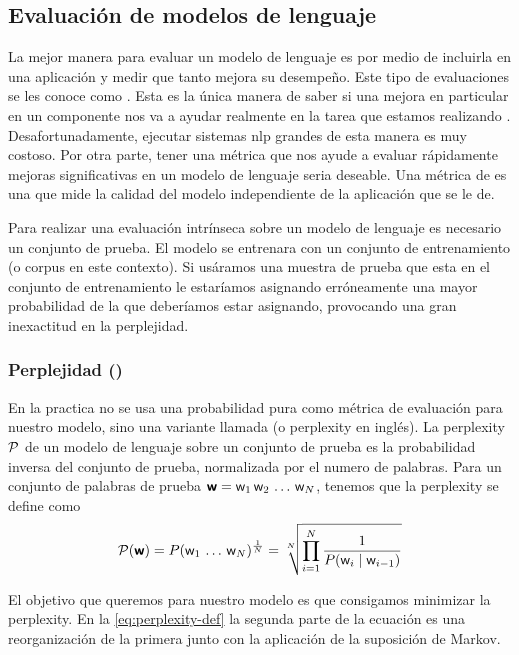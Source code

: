 \subsection{Evaluación de modelos de lenguaje}
La mejor manera para evaluar un modelo de lenguaje es por medio de incluirla en una aplicación y medir que tanto mejora su desempeño. Este tipo de evaluaciones se les conoce como . Esta es la única manera de saber si una mejora en particular en un componente nos va a ayudar realmente en la tarea que estamos realizando \cite{jurafsky-martin}. Desafortunadamente, ejecutar sistemas \gls{nlp} grandes de esta manera es muy costoso. Por otra parte, tener una métrica que nos ayude a evaluar rápidamente mejoras significativas en un modelo de lenguaje seria deseable. Una métrica de  es una que mide la calidad del modelo independiente de la aplicación que se le de.

Para realizar una evaluación intrínseca sobre un modelo de lenguaje es necesario un conjunto de prueba. El modelo se entrenara con un conjunto de entrenamiento (o \gls{corpus} en este contexto). Si usáramos una muestra de prueba que esta en el conjunto de entrenamiento le estaríamos asignando erróneamente una mayor probabilidad de la que deberíamos estar asignando, provocando una gran inexactitud en la perplejidad.

\subsubsection{Perplejidad ()}
En la practica no se usa una probabilidad pura como métrica de evaluación para nuestro modelo, sino una variante llamada  (o \gls{perplexity} en inglés). La \gls{perplexity} $\mathcal{P}$ de un modelo de lenguaje sobre un conjunto de prueba es la probabilidad inversa del conjunto de prueba, normalizada por el numero de palabras. Para un conjunto de palabras de prueba ${\bm{\mathit{\mathsf{w}}}} = {\mathit{\mathsf{w}}}_1 \, {\mathit{\mathsf{w}}}_2 \, \ldots \, {\mathit{\mathsf{w}}}_N$, tenemos que la \gls{perplexity} se define como
\begin{equation} \label{eq:perplexity-def}
  \mathcal{P}({\bm{\mathit{\mathsf{w}}}}) = P({\mathit{\mathsf{w}}}_1 \, \ldots \, {\mathit{\mathsf{w}}}_N)^{\frac{1}{N}} = \sqrt[N]{\prod_{i=1}^{N} \frac{1}{P({\mathit{\mathsf{w}}}_i \mid {\mathit{\mathsf{w}}}_{i-1})}}
\end{equation}

El objetivo que queremos para nuestro modelo es que consigamos minimizar la \gls{perplexity}. En la \cref{eq:perplexity-def} la segunda parte de la ecuación es una reorganización de la primera junto con la aplicación de la suposición de Markov.

